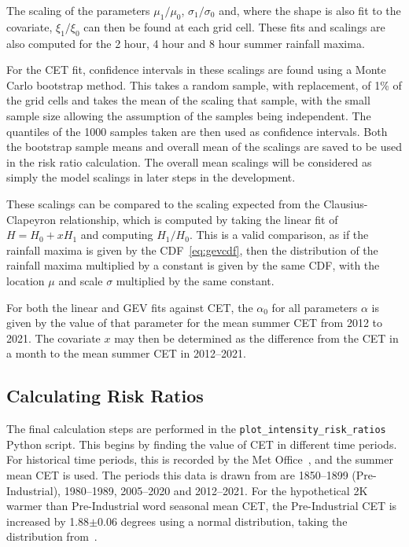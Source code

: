 The scaling of the parameters $\mu_1 / \mu_0$, $\sigma_1 / \sigma_0$ and, where the shape is also fit to the covariate,
    $\xi_1 / \xi_0$ can then be found at each grid cell.
These fits and scalings are also computed for the 2 hour, 4 hour and 8 hour summer rainfall maxima.

For the CET fit,
    confidence intervals in these scalings are found using a Monte Carlo bootstrap method.
This takes a random sample, with replacement, of 1\% of the grid cells and takes the mean of the scaling that sample,
    with the small sample size allowing the assumption of the samples being independent.
The quantiles of the 1000 samples taken are then used as confidence intervals.
Both the bootstrap sample means and overall mean of the scalings are saved to be used in the risk ratio calculation.
The overall mean scalings will be considered as simply the model scalings in later steps in the development.

These scalings can be compared to the scaling expected from the Clausius-Clapeyron relationship,
    which is computed by taking the linear fit of $H = H_0 + xH_1$ and computing $H_1 / H_0$.
This is a valid comparison, as if the rainfall maxima is given by the CDF~\ref{eq:gevcdf},
    then the distribution of the rainfall maxima multiplied by a constant is given by the same CDF,
    with the location $\mu$ and scale $\sigma$ multiplied by the same constant.

For both the linear and GEV fits against CET, the $\alpha_0$ for all parameters $\alpha$ is given by the value of that parameter for
    the mean summer CET from 2012 to 2021.
The covariate $x$ may then be determined as the difference from the CET in a month to the mean summer CET in 2012--2021.

\subsection{Calculating Risk Ratios}\label{subsec:riskratios}

The final calculation steps are performed in the \texttt{plot\_intensity\_risk\_ratios} Python script.
This begins by finding the value of CET in different time periods.
For historical time periods,
    this is recorded by the Met Office~\cite{CET},
    and the summer mean CET is used.
The periods this data is drawn from are 1850--1899 (Pre-Industrial),
    1980--1989, 2005--2020 and 2012--2021.
For the hypothetical 2K warmer than Pre-Industrial word seasonal mean CET,
    the Pre-Industrial CET is increased by 1.88$\pm$0.06 degrees using a normal distribution,
    taking the distribution from~\cite{Tett_Soon}.


